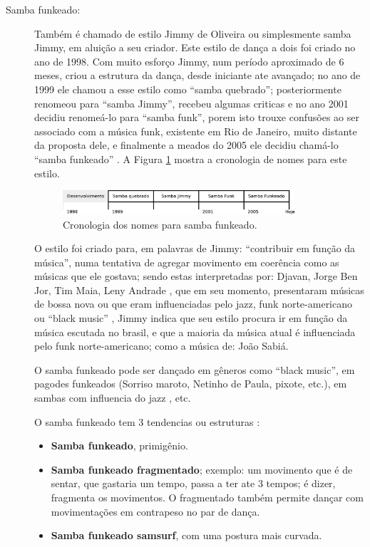 \begin{description}
\item[Samba funkeado:] 
Também é chamado de estilo Jimmy de Oliveira ou simplesmente  samba Jimmy, 
em aluição a seu criador.
Este estilo de dança a dois foi criado no ano de 1998.
Com muito esforço Jimmy, num período aproximado de 6 meses, 
criou a estrutura da dança, desde iniciante ate avançado;
no ano de 1999 ele  chamou a esse estilo como ``samba quebrado'';  
posteriormente renomeou  para ``samba Jimmy'', 
recebeu algumas criticas e no ano 2001 decidiu renomeá-lo para ``samba funk'',
porem isto trouxe confusões   ao ser associado com a música funk, existente em Rio de Janeiro,
muito distante da proposta dele, e
finalmente a meados do 2005 ele decidiu chamá-lo ``samba funkeado''  \cite{sambafunkeadoJimmyDeOliveiraPart1}.
A Figura \ref{fig:funkeadocrono1} mostra a cronologia de nomes para este estilo.
\begin{figure}[h]
  \centering
    \includegraphics[width=0.85\textwidth]{chapters/cap-historia-musicasamba/sambafunkeado.eps}
  \caption{Cronologia dos nomes para samba funkeado.}
\label{fig:funkeadocrono1}
\end{figure}

O estilo foi criado para, em palavras de Jimmy: ``contribuir em função da música'', 
numa tentativa de agregar movimento em coerência como as músicas que ele gostava;
sendo estas interpretadas por:
Djavan, Jorge Ben Jor, Tim Maia, Leny Andrade \cite{sambafunkeadoJimmyDeOliveiraPart1}, que em seu momento, 
presentaram músicas de bossa nova ou que eram influenciadas pelo jazz, funk norte-americano ou ``black music'' \cite{sambafunkeadoJimmyDeOliveiraPart1} \cite{sambafunkeadoJimmyDeOliveiraPart3},
Jimmy indica que seu estilo procura ir em função da música escutada no brasil, 
e que a maioria da música atual é influenciada pelo funk norte-americano;
como a música de: João Sabiá. 

O samba funkeado pode ser dançado em gêneros como ``black music'',
em pagodes funkeados (Sorriso maroto, Netinho de Paula, pixote, etc.), em sambas com influencia do jazz \cite{sambafunkeadoJimmyDeOliveiraPart3}, etc. 

O samba funkeado tem 3 tendencias ou estruturas  \cite{sambafunkeadoJimmyDeOliveiraPart2}:
\begin{itemize}
\item \textbf{Samba funkeado}, primigênio.
\item \textbf{Samba funkeado fragmentado}; exemplo: um movimento que é de sentar, que gastaria um tempo, 
passa a ter ate 3 tempos; é dizer, fragmenta os movimentos. 
O fragmentado também permite dançar com movimentações em contrapeso no par de dança.
\item \textbf{Samba funkeado samsurf}, com uma postura mais curvada.
\end{itemize}


\end{description}
